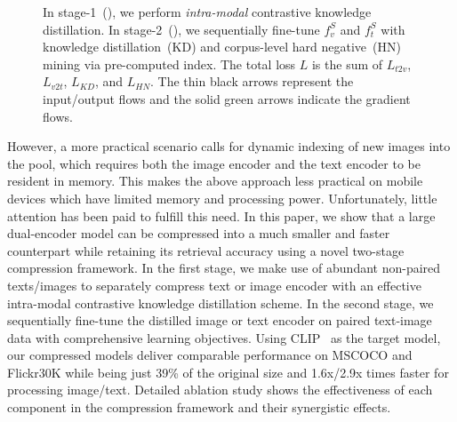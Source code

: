 \begin{figure}[t!]
	\centering
	\caption{In stage-1~(), we perform  \textit{intra-modal} contrastive knowledge distillation. In stage-2~(), we sequentially fine-tune  $f_v^{S}$ and $f_t^{S}$ with knowledge distillation~(KD) and corpus-level hard negative~(HN) mining via pre-computed index. The total loss $L$ is the sum of $L_{t2v}$, $L_{v2t}$, $L_{KD}$, and $L_{HN}$. The thin black arrows represent the input/output flows and 
the solid green arrows indicate the gradient flows.
	} \label{fig:overview}
\end{figure}

However, a more practical scenario calls for dynamic indexing of new images into the pool,
which requires both the image encoder and the text encoder to be resident in memory. 
This makes the above approach less practical on mobile devices which have limited
memory and processing power. Unfortunately, little attention has been paid to fulfill this need. 
In this paper, we show that a large dual-encoder model can be compressed into 
a much smaller and faster counterpart while retaining its retrieval accuracy 
using a novel two-stage compression framework. 
In the first stage, we make use of abundant non-paired texts/images to separately 
compress text or image encoder with an effective intra-modal contrastive knowledge 
distillation scheme. In the second stage, we sequentially fine-tune the distilled image or
text encoder on paired text-image data with comprehensive learning objectives.
Using CLIP~\cite{clip} as the target model, our compressed models deliver comparable performance on MSCOCO and Flickr30K while being just 39\% of the original size 
and 1.6x/2.9x times faster for processing image/text. 
Detailed ablation study shows the effectiveness of each component in the 
compression framework and their synergistic effects. 


